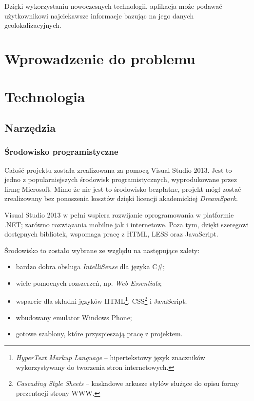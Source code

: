 \documentclass{book}
\begin{document}
		Dzięki wykorzystaniu nowoczesnych technologii, aplikacja może podawać użytkownikowi najciekawsze informacje bazując na jego danych geolokalizacyjnych. 
	
	
	\chapter{Wprowadzenie do problemu}
	
	\chapter{Technologia}
		\section{Narzędzia}		
			\subsection{Środowisko programistyczne}
				
			Całość projektu została zrealizowana za pomocą Visual Studio 2013. Jest to jedno z popularniejszych środowisk programistycznych, wyprodukowane przez firmę Microsoft. Mimo że nie jest to środowisko bezpłatne, projekt mógł zostać zrealizowany bez ponoszenia kosztów dzięki licencji akademickiej \textit{DreamSpark}. 
			
			Visual Studio 2013 w pełni wspiera rozwijanie oprogramowania w platformie .NET; zarówno rozwiązania mobilne jak i internetowe. Poza tym, dzięki szeregowi dostępnych bibliotek, wspomaga pracę z HTML, LESS oraz JavaScript.
			
			Środowisko to zostało wybrane ze względu na następujące zalety:
			\begin{itemize}
				\item bardzo  dobra obsługa \textit{IntelliSense} dla języka C\#;
				\item wiele pomocnych rozszerzeń, np. \textit{Web Essentials};
				\item wsparcie dla składni języków HTML\footnote{\emph{HyperText Markup Language} -- hipertekstowy język znaczników wykorzystywany do tworzenia stron internetowych.}, CSS\footnote{\emph{Cascading Style Sheets} -- kaskadowe arkusze stylów służące do opisu formy prezentacji strony WWW.} i JavaScript;
				\item wbudowany emulator Windows Phone;
				\item gotowe szablony, które przyspieszają pracę z projektem.
			\end{itemize}
			
\end{document}
